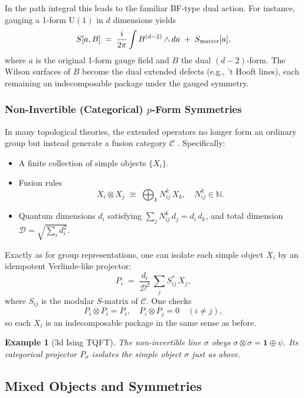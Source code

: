 \documentclass[12pt,a4paper]{article}
\newtheorem{example}{Example}
\begin{document}
In the path integral this leads to the familiar BF-type dual action.
For instance, gauging a 1-form $\mathrm{U}(1)$ in $d$ dimensions yields
\[
S[a,B]
\;=\;
\frac{i}{2\pi}\int B^{(d-2)}\wedge da
\;+\;S_{\rm matter}[a],
\]
where $a$ is the original 1-form gauge field and $B$ the dual $(d-2)$-form.
The Wilson surfaces of $B$ become the dual extended defects (e.g., ’t Hooft lines), each remaining an indecomposable package under the gauged symmetry.



\subsubsection{Non-Invertible (Categorical) $p$-Form Symmetries}


In many topological theories, the extended operators no longer form an ordinary group but instead generate a fusion category $\mathcal C$ \cite{Etingof2005}.
Specifically:
\begin{itemize}
	\item A finite collection of simple objects $\{X_i\}$.
	
	\item Fusion rules
	\[
	X_i\otimes X_j \;\cong\;\bigoplus_k N_{ij}^k\,X_k,
	\quad
	N_{ij}^k\in\mathbb N.
	\]
	
	\item Quantum dimensions $d_i$ satisfying	$\sum_jN_{ij}^k\,d_j=d_i\,d_k$,
	and total dimension $\mathcal D=\sqrt{\sum_i d_i^2}$.
\end{itemize}


Exactly as for group representations, one can isolate each simple object $X_i$ by an idempotent Verlinde-like projector:
\[
P_i
\;=\;
\frac{d_i}{\mathcal D^2}\,
\sum_j S_{ij}^*\,X_j,
\]
where $S_{ij}$ is the modular $S$-matrix of $\mathcal C$.
One checks
\[
P_i\otimes P_i = P_i,
\quad
P_i\otimes P_j = 0\quad(i\neq j),
\]
so each $X_i$ is an indecomposable package in the same sense as before.


\begin{example}[3d Ising TQFT]
	The non-invertible line $\sigma$ obeys $\sigma\otimes\sigma=\mathbf1\oplus\psi$.
	Its categorical projector $P_\sigma$ isolates the simple object $\sigma$ just as above.
\end{example}



\subsection{Mixed Objects and Symmetries}
\end{document}
